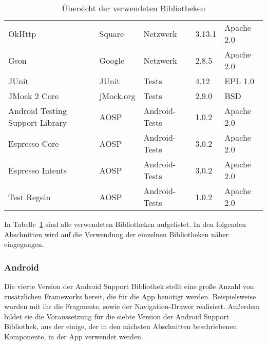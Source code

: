 \begin{table}[h]
\begin{tabularx}{\textwidth}{|X|l|l|l|l|}
        OkHttp & Square & Netzwerk & 3.13.1 & Apache 2.0\\   %
        Gson & Google & Netzwerk & 2.8.5 & Apache 2.0\\   %
        \hline

        JUnit & JUnit & Tests & 4.12 & EPL 1.0\\   %
        JMock 2 Core & jMock.org & Tests & 2.9.0 & BSD\\    %
        \hline

        Android Testing Support Library & AOSP & Android-Tests & 1.0.2 & Apache 2.0\\   %
        Espresso Core & AOSP & Android-Tests & 3.0.2 & Apache 2.0\\    %
        Espresso Intents & AOSP & Android-Tests & 3.0.2 & Apache 2.0\\ %
        Test Regeln & AOSP & Android-Tests & 1.0.2 & Apache 2.0\\  %
        \hline
    \end{tabularx}

    \caption{Übersicht der verwendeten Bibliotheken}
    \label{tab:libraries}
\end{table}

In Tabelle~\ref{tab:libraries} sind alle verwendeten Bibliotheken aufgelistet.
In den folgenden Abschnitten wird auf die Verwendung der einzelnen Bibliotheken näher eingegangen.

\subsubsection{Android} \label{subsubsec:android-libraries}
Die vierte Version der Android Support Bibliothek stellt eine große Anzahl von zusätzlichen Frameworks bereit, die für die App benötigt werden.
Beispielsweise wurden mit ihr die Fragmente, sowie der Navigation-Drawer realisiert.
Außerdem bildet sie die Voraussetzung für die siebte Version der Android Support Bibliothek, aus der einige, der in den nächsten Abschnitten beschriebenen Komponente, in der App verwendet werden.

